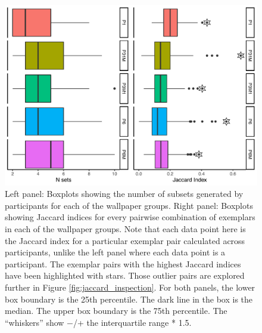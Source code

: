 \documentclass[symmetry,article,accept,pdftex,moreauthors]{Definitions/mdpi}
\begin{document}
\begin{figure}[H]

	\includegraphics[scale=0.65]{./figures/nsets_jaccard_summary.pdf}
	\caption{Left panel: Boxplots showing the number of subsets generated by participants for each of the wallpaper groups. Right panel: Boxplots showing Jaccard indices for every pairwise combination of exemplars in each of the wallpaper groups. Note that each data point here is the Jaccard index for a particular exemplar pair calculated across participants, unlike the left panel where each data point is a participant. The exemplar pairs with the highest Jaccard indices have been highlighted with stars. Those outlier pairs are explored further in Figure \ref{fig:jaccard_inspection}. For both panels, the lower box boundary is the 25th percentile. The dark line in the box is the median. The upper box boundary is the 75th percentile. The “whiskers” show $-$/+ the interquartile range * 1.5. }
	\label{fig:n_sets_jaccard_summary}
\end{figure}
\end{document}
